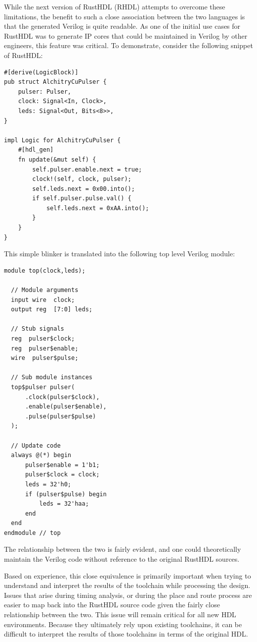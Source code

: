 \documentclass[conference]{IEEEtran}
\begin{document}
While the next version of RustHDL (RHDL) attempts to overcome these limitations, the benefit to such a close 
association between the two languages is that the generated Verilog is quite readable.  As one of the initial 
use cases for RustHDL was to generate IP cores that could be maintained in Verilog by other engineers, this feature
was critical.  To demonstrate, consider the following snippet of RustHDL:

\begin{verbatim}
#[derive(LogicBlock)]
pub struct AlchitryCuPulser {
    pulser: Pulser,
    clock: Signal<In, Clock>,
    leds: Signal<Out, Bits<8>>,
}

impl Logic for AlchitryCuPulser {
    #[hdl_gen]
    fn update(&mut self) {
        self.pulser.enable.next = true;
        clock!(self, clock, pulser);
        self.leds.next = 0x00.into();
        if self.pulser.pulse.val() {
            self.leds.next = 0xAA.into();
        }
    }
}
\end{verbatim}

This simple blinker is translated into the following top level Verilog module:

\begin{verbatim}
module top(clock,leds);
  
  // Module arguments
  input wire  clock;
  output reg  [7:0] leds;
  
  // Stub signals
  reg  pulser$clock;
  reg  pulser$enable;
  wire  pulser$pulse;
  
  // Sub module instances
  top$pulser pulser(
      .clock(pulser$clock),
      .enable(pulser$enable),
      .pulse(pulser$pulse)
  );
  
  // Update code
  always @(*) begin
      pulser$enable = 1'b1;
      pulser$clock = clock;
      leds = 32'h0;
      if (pulser$pulse) begin
          leds = 32'haa;
      end
  end  
endmodule // top
\end{verbatim}

The relationship between the two is fairly evident, and one could theoretically maintain the Verilog
code without reference to the original RustHDL sources.

Based on experience, this close equivalence is primarily important when trying to understand and interpret 
the results of the toolchain while processing the design.  Issues that arise during timing analysis, or
during the place and route process are easier to map back into the RustHDL source code given the fairly 
close relationship between the two.  This issue will remain critical for all new HDL environments.  Because 
they ultimately rely upon existing toolchains, it can be difficult to interpret the results of those toolchains
in terms of the original HDL.
\end{document}
